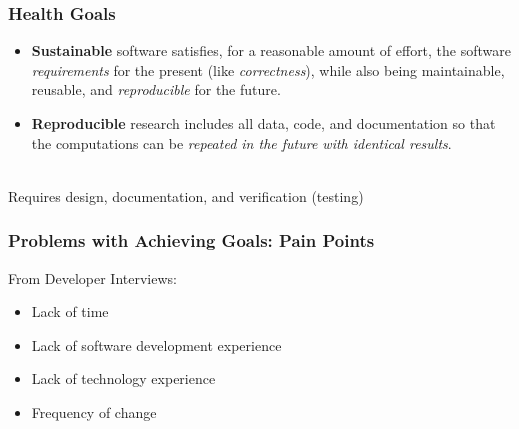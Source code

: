 \documentclass[usenames,dvipsnames]{beamer}
\begin{document}
\begin{frame}

\frametitle{Health Goals}

\begin{itemize}
    \item \textbf{Sustainable} software satisfies, for a reasonable amount of
    effort, the software \emph{requirements} for the present (like
    \emph{correctness}), while also being maintainable, reusable, and
    \emph{reproducible} for the future.
    \item \textbf{Reproducible} research includes all data, code, and
    documentation so that the computations can be \emph{repeated in the future
    with identical results}.
\end{itemize}

~\\
Requires design, documentation, and verification (testing)

\end{frame}


\begin{frame}

\frametitle{Problems with Achieving Goals: Pain Points}

\vspace{-1.5cm}
From Developer Interviews:
\begin{itemize}
\item Lack of time
\item Lack of software development experience %
\item Lack of technology experience %
\item Frequency of change
\end{itemize}


\end{frame}
\end{document}
